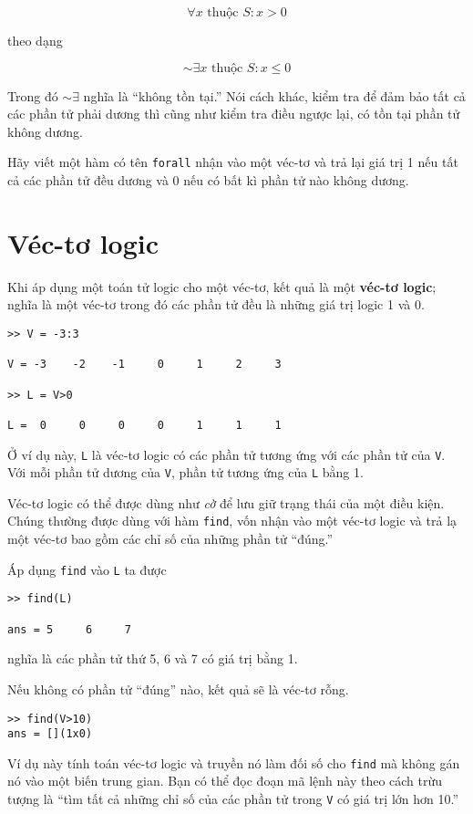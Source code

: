 \documentclass[12pt]{book}
\begin{document}
\[ \forall x \mbox{~thuộc~} S: x>0 \]

\noindent theo dạng

\[ \sim \exists x \mbox{~thuộc~} S: x \le 0 \]

Trong đó $\sim \exists$ nghĩa là ``không tồn tại.'' Nói cách khác,
kiểm tra để đảm bảo tất cả các phần tử phải dương thì cũng như
kiểm tra điều ngược lại, có tồn tại phần tử không dương.

\begin{ex}
Hãy viết một hàm có tên {\tt forall} nhận vào một véc-tơ và trả lại
giá trị 1 nếu tất cả các phần tử đều dương và 0 nếu có bất kì phần
tử nào không dương.
\end{ex}




\section{Véc-tơ logic}

Khi áp dụng một toán tử logic cho một véc-tơ, kết quả là một
{\bf véc-tơ logic}; nghĩa là một véc-tơ trong đó các phần tử
đều là những giá trị logic 1 và 0.

\begin{verbatim}
>> V = -3:3

V = -3    -2    -1     0     1     2     3

>> L = V>0

L =  0     0     0     0     1     1     1
\end{verbatim}
%
Ở ví dụ này, {\tt L} là véc-tơ logic có các phần tử tương ứng với
các phần tử của {\tt V}. Với mỗi phần tử dương của
{\tt V}, phần tử tương ứng của {\tt L} bằng 1.

Véc-tơ logic có thể được dùng như \emph{cờ} để lưu giữ trạng thái
của một điều kiện. Chúng thường được dùng với hàm {\tt find},
vốn nhận vào một véc-tơ logic và trả lạ một véc-tơ bao gồm các
chỉ số của những phần tử ``đúng.''

Áp dụng {\tt find} vào {\tt L} ta được

\begin{verbatim}
>> find(L)

ans = 5     6     7
\end{verbatim}
%
\noindent nghĩa là các phần tử thứ 5, 6 và 7  có giá trị bằng 1.

Nếu không có phần tử ``đúng'' nào, kết quả sẽ là véc-tơ rỗng.

\begin{verbatim}
>> find(V>10)
ans = [](1x0)
\end{verbatim}
%
Ví dụ này tính toán véc-tơ logic và truyền nó làm đối số cho
{\tt find} mà không gán nó vào một biến trung gian. Bạn có thể
đọc đoạn mã lệnh này theo cách trừu tượng là ``tìm tất cả
những chỉ số của các phần tử trong {\tt V} có giá trị lớn hơn 10.''
\end{document}
